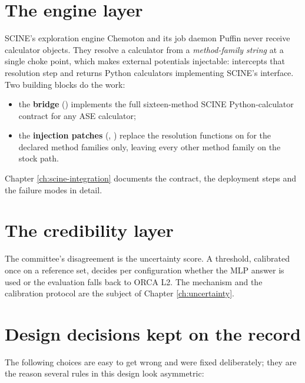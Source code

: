 \section{The engine layer}

SCINE's exploration engine Chemoton \cite{unsleber2022chemoton} and its job
daemon Puffin \cite{bensberg2025puffin} never receive calculator objects.
They resolve a calculator from a \emph{method-family string} at a single
choke point, which makes external potentials injectable: \jns{} intercepts
that resolution step and returns Python calculators implementing SCINE's
 interface.  Two building blocks do the work:

\begin{itemize}
  \item the \textbf{bridge} () implements the
    full sixteen-method SCINE Python-calculator contract for any ASE
    calculator;
  \item the \textbf{injection patches} (,
    ) replace the resolution functions on
     for the declared method families only,
    leaving every other method family on the stock path.
\end{itemize}

Chapter \ref{ch:scine-integration} documents the contract, the deployment
steps and the failure modes in detail.

\section{The credibility layer}

The committee's disagreement is the uncertainty score.  A threshold,
calibrated once on a reference set, decides per configuration whether the
MLP answer is used or the evaluation falls back to ORCA L2.  The mechanism
and the calibration protocol are the subject of Chapter
\ref{ch:uncertainty}.

\section{Design decisions kept on the record}

The following choices are easy to get wrong and were fixed deliberately;
they are the reason several rules in this design look asymmetric:

